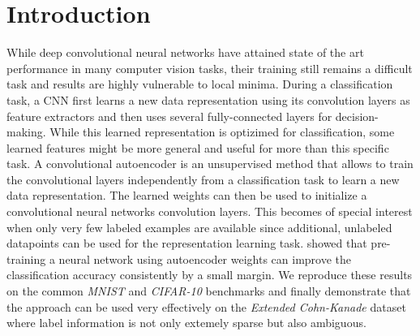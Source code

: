 \documentclass{article}
\begin{document}
\section{Introduction}
  While deep convolutional neural networks have attained state of the art performance in many computer vision tasks, their training still remains a difficult task and results are highly vulnerable to local minima. 
  During a classification task, a CNN first learns a new data representation using its convolution layers as feature extractors and then uses several fully-connected layers for decision-making. 
  While this learned representation is optizimed for classification, some learned features might be more general and useful for more than this specific task. 
  A convolutional autoencoder is an unsupervised method that allows to train the convolutional layers independently from a classification task to learn a new data representation. The learned weights can then be used to initialize a convolutional neural networks convolution layers. 
  This becomes of special interest when only very few labeled examples are available since additional, unlabeled datapoints can be used for the representation learning task. 
  \citep{masci11} showed that pre-training a neural network using autoencoder weights can improve the classification accuracy consistently by a small margin.
  We reproduce these results on the common \emph{MNIST} and \emph{CIFAR-10} benchmarks and finally demonstrate that the approach can be used very effectively on the \emph{Extended Cohn-Kanade} dataset where label information is not only extemely sparse but also ambiguous. 
\end{document}
